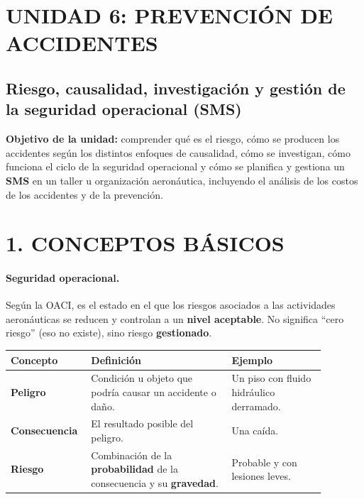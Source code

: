 \clearpage
\section*{UNIDAD 6: PREVENCIÓN DE ACCIDENTES}
\subsection*{Riesgo, causalidad, investigación y gestión de la seguridad operacional (SMS)}

\begin{recuadro}
\textbf{Objetivo de la unidad:} comprender qué es el riesgo, cómo se producen los accidentes según
los distintos enfoques de causalidad, cómo se investigan, cómo funciona el ciclo de la seguridad
operacional y cómo se planifica y gestiona un \textbf{SMS} en un taller u organización
aeronáutica, incluyendo el análisis de los costos de los accidentes y de la prevención.
\end{recuadro}

\section*{1. CONCEPTOS BÁSICOS}

\paragraph*{Seguridad operacional.} Según la OACI, es el estado en el que los riesgos asociados a
las actividades aeronáuticas se reducen y controlan a un \textbf{nivel aceptable}. No significa
``cero riesgo'' (eso no existe), sino riesgo \textbf{gestionado}.

\begin{center}
\small
\begin{tabular}{|p{0.18\linewidth}|p{0.42\linewidth}|p{0.28\linewidth}|}
\hline
\textbf{Concepto} & \textbf{Definición} & \textbf{Ejemplo} \\ \hline
\textbf{Peligro} & Condición u objeto que podría causar un accidente o daño. & Un piso con
fluido hidráulico derramado. \\ \hline
\textbf{Consecuencia} & El resultado posible del peligro. & Una caída. \\ \hline
\textbf{Riesgo} & Combinación de la \textbf{probabilidad} de la consecuencia y su
\textbf{gravedad}. & Probable y con lesiones leves. \\ \hline
\end{tabular}
\end{center}

